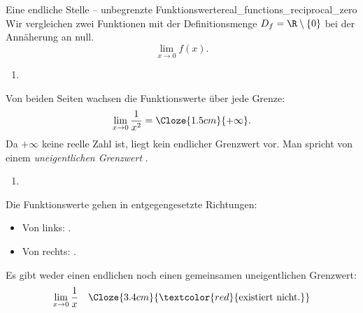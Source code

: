 \begin{ExampleBox}{Eine endliche Stelle -- unbegrenzte Funktionswerte}{real_functions_reciprocal_zero}
  Wir vergleichen zwei Funktionen mit der Definitionsmenge
  $D_f=\R\setminus\{0\}$ bei der Annäherung an null.
  \[
    \lim_{x\to0}f(x).
  \]
  \par\smallskip\noindent
  \begin{minipage}[t]{0.47\linewidth}
    \begin{enumerate}[label=\alph*),leftmargin=*,topsep=0pt]
      \item \strut
    \end{enumerate}
    \vspace{-0.5\baselineskip}
    \begin{minipage}[c][5.2cm][c]{\linewidth}
      \centering
    \end{minipage}
    \par\smallskip
    Von beiden Seiten wachsen die Funktionswerte über jede Grenze:
    \[
      \lim_{x\to0}\frac1{x^2}=\Cloze{1.5cm}{+\infty}.
    \]
    Da $+\infty$ keine reelle Zahl ist, liegt kein endlicher Grenzwert vor.
    Man spricht von einem \emph{uneigentlichen Grenzwert}
    .
  \end{minipage}\hfill
  \begin{minipage}[t]{0.47\linewidth}
    \begin{enumerate}[label=\alph*),start=2,leftmargin=*,topsep=0pt]
      \item \strut
    \end{enumerate}
    \vspace{-0.5\baselineskip}
    \begin{minipage}[c][5.2cm][c]{\linewidth}
      \centering
    \end{minipage}
    \par\smallskip
    Die Funktionswerte gehen in entgegengesetzte Richtungen:
    \begin{itemize}[itemsep=0.2em]
      \item Von links: .
      \item Von rechts: .
    \end{itemize}
    \par\medskip
    Es gibt weder einen endlichen noch einen gemeinsamen
    uneigentlichen Grenzwert:
    \[
      \lim_{x\to0}\frac1x\quad
      \Cloze{3.4cm}{\textcolor{red}{\text{existiert nicht.}}}
    \]
  \end{minipage}
\end{ExampleBox}



